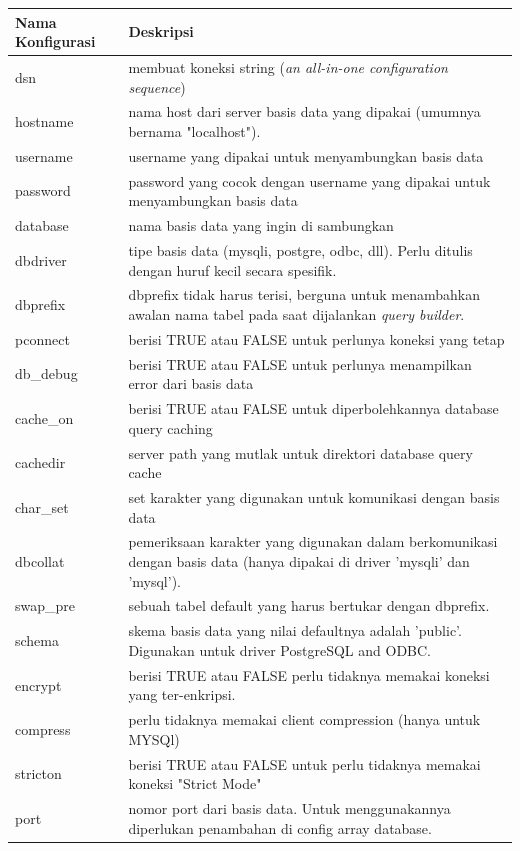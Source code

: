 	\begin{center}
	\begin{tabular}{| m{5cm} | m{10cm} |}
		\hline
		Nama Konfigurasi & Deskripsi\\
		\hline
		dsn & membuat koneksi string  (\textit{an all-in-one configuration sequence})\\
		\hline
		hostname & nama host dari server basis data yang dipakai (umumnya bernama "localhost").\\
		\hline
		username & username yang dipakai untuk menyambungkan basis data\\
		\hline
		password & password yang cocok dengan username yang dipakai untuk menyambungkan basis data\\
		\hline
		database & nama basis data yang ingin di sambungkan\\
		\hline
		dbdriver & tipe basis data (mysqli, postgre, odbc, dll). Perlu ditulis dengan huruf kecil secara spesifik.\\
		\hline
		dbprefix & dbprefix tidak harus terisi, berguna untuk menambahkan awalan nama tabel pada saat dijalankan \textit{query builder}.\\
		\hline
		pconnect & berisi TRUE atau FALSE untuk perlunya koneksi yang tetap\\
		\hline
		db\_debug & berisi TRUE atau FALSE untuk perlunya menampilkan error dari basis data\\
		\hline
		cache\_on & berisi TRUE atau FALSE untuk diperbolehkannya database query caching\\
		\hline
		cachedir & server path yang mutlak untuk direktori database query cache\\
		\hline
		char\_set & set karakter yang digunakan untuk komunikasi dengan basis data\\
		\hline
		dbcollat & pemeriksaan karakter yang digunakan dalam berkomunikasi dengan basis data (hanya dipakai di driver 'mysqli' dan 'mysql').\\
		\hline
		swap\_pre & sebuah tabel default yang harus bertukar dengan dbprefix.\\
		\hline
		schema & skema basis data yang nilai defaultnya adalah 'public'. Digunakan untuk driver PostgreSQL and ODBC.\\
		\hline
		encrypt &  berisi TRUE atau FALSE perlu tidaknya memakai koneksi yang ter-enkripsi.\\
		\hline
		compress & perlu tidaknya memakai client compression (hanya untuk MYSQl)\\
		\hline
		stricton &  berisi TRUE atau FALSE untuk perlu tidaknya memakai koneksi "Strict Mode" \\
		\hline
		port & nomor port dari basis data. Untuk menggunakannya diperlukan penambahan di config array database.\\
		\hline
	\end{tabular}
\end{center}
	
